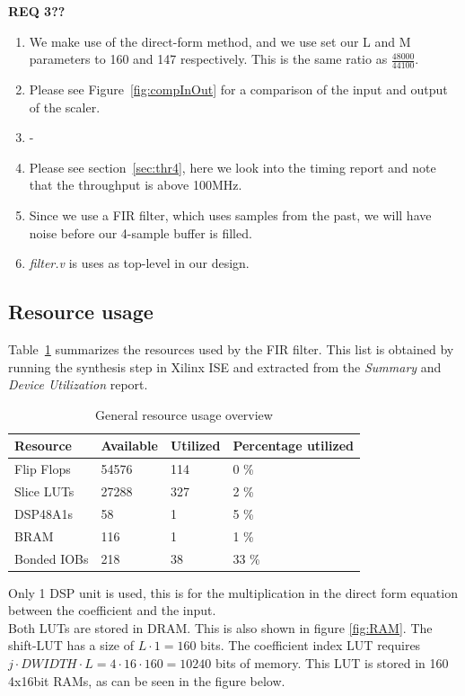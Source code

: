 \documentclass[a4paper,twoside,11pt, fleqn]{article}
\begin{document}
\textbf{REQ 3??}

\begin{enumerate}
	\item We make use of the direct-form method, and we use set our L and M parameters to 160 and 147 respectively. This is the same ratio as $\frac{48000}{44100}$.
	\item Please see Figure~\ref{fig:compInOut} for a comparison of the input and output of the scaler.
	\item -
	\item Please see section~\ref{sec:thr4}, here we look into the timing report and note that the throughput is above 100MHz.
	\item Since we use a FIR filter, which uses samples from the past, we will have noise before our 4-sample buffer is filled.
	\item \textit{filter.v} is uses as top-level in our design.
\end{enumerate}

\subsection{Resource usage}
\label{sec:resc4}
Table~\ref{tab:4usage} summarizes the resources used by the FIR filter. This list is obtained by running the synthesis step in Xilinx ISE and extracted from the \textit{Summary} and \textit{Device Utilization} report.

\begin{table}[h]
\begin{tabular}{|l|l|l|l|}
\hline
\textbf{Resource} & \textbf{Available} & \textbf{Utilized} & \textbf{Percentage utilized}\\
\hline
Flip Flops	& 54576 & 114 	& 0 \%\\
Slice LUTs 	& 27288 & 327 	& 2 \%\\
DSP48A1s	& 58 	& 1 	& 5 \%\\
BRAM		& 116 	& 1 	& 1 \%\\
Bonded IOBs	& 218 	& 38 	& 33 \%\\
\hline
\end{tabular}
\caption{General resource usage overview}
\label{tab:4usage}
\end{table}

Only 1 DSP unit is used, this is for the multiplication in the direct form equation between the coefficient and the input.\\

Both LUTs are stored in DRAM. This is also shown in figure \ref{fig:RAM}. The shift-LUT has a size of $L\cdot 1 = 160$ bits. The coefficient index LUT requires $j\cdot DWIDTH\cdot L = 4\cdot 16 \cdot 160 = 10240$ bits of memory. This LUT is stored in 160 4x16bit RAMs, as can be seen in the figure below.\\ 
\end{document}
